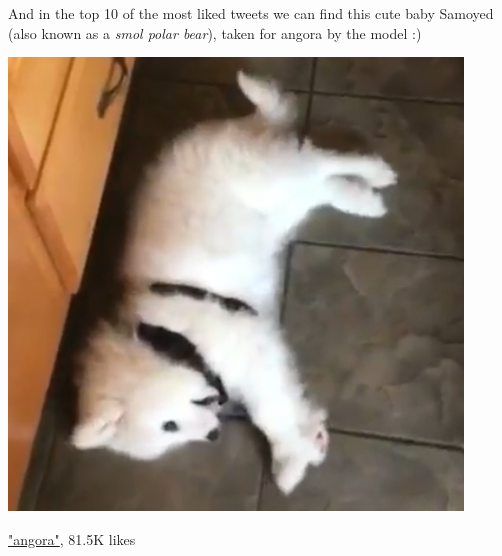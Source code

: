 \documentclass{article}
\begin{document}
\vspace{20pt}

And in the top 10 of the most liked tweets we can find this cute baby Samoyed (also known as a \textit{smol polar bear}), taken for angora by the model :)

\begin{center}
\includegraphics[scale=0.5]{error3.png}

\href{https://twitter.com/dog_rates/status/859196978902773760/video/1}{"angora"}, 81.5K likes
\end{center}
\end{document}
